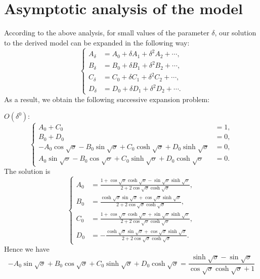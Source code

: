 \documentclass{article}
\begin{document}
\section{Asymptotic analysis of the model}

According to the above analysis, for small values of the parameter $\delta$, our solution to the derived model can be expanded in the following way:
\begin{equation}
    \left\{\begin{aligned}
        A_\delta &= A_0 + \delta A_1 + \delta^2 A_2 + \cdots, \\
        B_\delta &= B_0 + \delta B_1 + \delta^2 B_2 + \cdots, \\
        C_\delta &= C_0 + \delta C_1 + \delta^2 C_2 + \cdots, \\
        D_\delta &= D_0 + \delta D_1 + \delta^2 D_2 + \cdots. 
    \end{aligned}\right.
\end{equation}
As a result, we obtain the following successive expansion problem:

\noindent
$O(\delta^0)$:
\begin{equation}
    \left\{\begin{aligned}
        A_0 + C_0 &= 1, \\
        B_0 + D_0 &= 0, \\
        - A_0 \cos{\sqrt{\sigma}} - B_0 \sin{\sqrt{\sigma}} + C_0 \cosh{\sqrt{\sigma}} + D_0 \sinh{\sqrt{\sigma}} &= 0, \\
        A_0 \sin{\sqrt{\sigma}} - B_0 \cos{\sqrt{\sigma}} + C_0 \sinh{\sqrt{\sigma}} + D_0 \cosh{\sqrt{\sigma}} &= 0.
    \end{aligned}\right.
\end{equation}
The solution is
\begin{equation}
    \left\{\begin{aligned}
        A_0 &= \frac{1 + \cos\sqrt{\sigma} \cosh\sqrt{\sigma} - \sin\sqrt{\sigma} \sinh\sqrt{\sigma} }{2 + 2 \cos\sqrt{\sigma} \cosh\sqrt{\sigma} }, \\
        B_0 &= \frac{\cosh\sqrt{\sigma} \sin\sqrt{\sigma} + \cos\sqrt{\sigma} \sinh\sqrt{\sigma} }{2 + 2 \cos\sqrt{\sigma} \cosh\sqrt{\sigma} }, \\
        C_0 &= \frac{1 + \cos\sqrt{\sigma} \cosh\sqrt{\sigma} + \sin\sqrt{\sigma} \sinh\sqrt{\sigma} }{2 + 2 \cos\sqrt{\sigma} \cosh\sqrt{\sigma} }, \\
        D_0 &= -\frac{\cosh\sqrt{\sigma} \sin\sqrt{\sigma} + \cos\sqrt{\sigma} \sinh\sqrt{\sigma} }{2 + 2 \cos\sqrt{\sigma} \cosh\sqrt{\sigma} }.
    \end{aligned}\right.
\end{equation}
Hence we have
\begin{equation}
    - A_0 \sin{\sqrt{\sigma}} + B_0 \cos{\sqrt{\sigma}} + C_0 \sinh{\sqrt{\sigma}} + D_0 \cosh{\sqrt{\sigma}} = \frac{\sinh\sqrt{\sigma }-\sin\sqrt{\sigma }}{\cos\sqrt{\sigma } \cosh\sqrt{\sigma }+1}
\end{equation}
\end{document}
